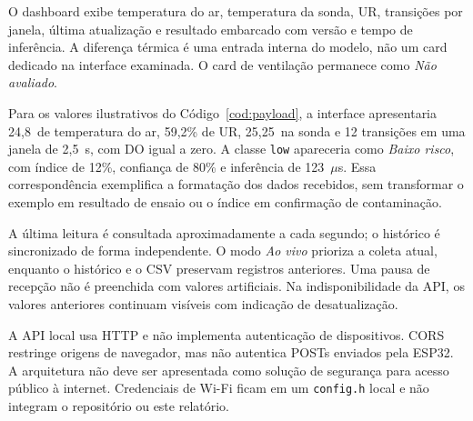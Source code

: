 O dashboard exibe temperatura do ar, temperatura da sonda, UR,
transições por janela, última atualização e resultado embarcado com
versão e tempo de inferência. A diferença térmica é uma entrada
interna do modelo, não um card dedicado na interface examinada.
O card de ventilação permanece como \textit{Não avaliado}.

Para os valores ilustrativos do Código~\ref{cod:payload}, a interface
apresentaria 24,8\celsius\ de temperatura do ar, 59,2\% de UR,
25,25\celsius\ na sonda e 12 transições em uma janela de 2,5~s,
com DO igual a zero. A classe \texttt{low} apareceria como
\textit{Baixo risco}, com índice de 12\%, confiança de 80\% e
inferência de 123~$\mu$s. Essa correspondência exemplifica a
formatação dos dados recebidos, sem transformar o exemplo em
resultado de ensaio ou o índice em confirmação de contaminação.

A última leitura é consultada aproximadamente a cada segundo; o
histórico é sincronizado de forma independente. O modo \textit{Ao vivo}
prioriza a coleta atual, enquanto o histórico e o CSV preservam
registros anteriores. Uma pausa de recepção não é preenchida com
valores artificiais. Na indisponibilidade da API, os valores anteriores
continuam visíveis com indicação de desatualização.

A API local usa HTTP e não implementa autenticação de dispositivos.
CORS restringe origens de navegador, mas não autentica POSTs enviados
pela ESP32. A arquitetura não deve ser apresentada como solução de
segurança para acesso público à internet. Credenciais de Wi-Fi ficam
em um \texttt{config.h} local e não integram o repositório ou este relatório.
\FloatBarrier
